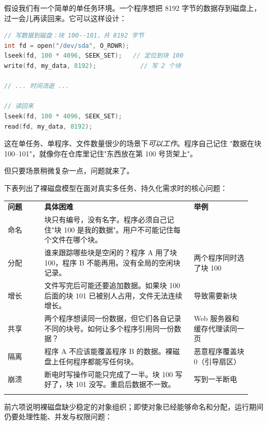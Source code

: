 \begin{filesystemlayout}

假设我们有一个简单的单任务环境。一个程序想把 8192 字节的数据存到磁盘上，
过一会儿再读回来。它可以这样设计：

\begin{lstlisting}[language=C]
// 写数据到磁盘：块 100--101，共 8192 字节
int fd = open("/dev/sda", O_RDWR);
lseek(fd, 100 * 4096, SEEK_SET);   // 定位到块 100
write(fd, my_data, 8192);            // 写 2 个块

// ... 时间流逝 ...

// 读回来
lseek(fd, 100 * 4096, SEEK_SET);
read(fd, my_data, 8192);
\end{lstlisting}

这在单任务、单程序、文件数量很少的场景下\emph{可以工作}。程序自己记住
"数据在块 100--101"，就像你在仓库里记住"东西放在第 100 号货架上"。

但只要场景稍微复杂一点，问题就来了。


下表列出了裸磁盘模型在面对真实多任务、持久化需求时的核心问题：

\begin{longtable}{|F{0.14\linewidth}|F{0.58\linewidth}|F{0.22\linewidth}|}
\hline
{}
\textbf{问题} & \textbf{具体困难} & \textbf{举例} \\\tablerowrule
\endhead
命名 & 块只有编号，没有名字。程序必须自己记住"块 100 是我的数据"。用户不可能记住每个文件在哪个块。 &  \\\tablerowrule
分配 & 谁来跟踪哪些块是空闲的？程序 A 用了块 100，程序 B 不能再用。没有全局的空闲块记录。 & 两个程序同时选了块 100 \\\tablerowrule
增长 & 文件写完后可能还要追加数据。如果块 100 后面的块 101 已被别人占用，文件无法连续增长。 &  导致需要新块 \\\tablerowrule
共享 & 两个程序想读同一份数据，但它们各自记录不同的块号。如何让多个程序引用同一份数据？ & Web 服务器和缓存代理读同一页 \\\tablerowrule
隔离 & 程序 A 不应该能覆盖程序 B 的数据。裸磁盘上任何程序都能写任何块。 & 恶意程序覆盖块 0（引导扇区） \\\tablerowrule
崩溃 & 断电时写操作可能只完成了一半。块 100 写好了，块 101 没写。重启后数据不一致。 & 写到一半断电 \\\tablerowrule
\end{longtable}

前六项说明裸磁盘缺少稳定的对象组织；即使对象已经能够命名和分配，运行期间仍要处理性能、并发与权限问题：


\end{filesystemlayout}
